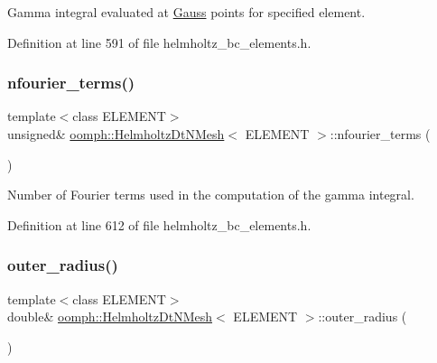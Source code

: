 Gamma integral evaluated at \hyperlink{classoomph_1_1Gauss}{Gauss} points for specified element. 



Definition at line 591 of file helmholtz\+\_\+bc\+\_\+elements.\+h.

\mbox{\label{classoomph_1_1HelmholtzDtNMesh_a7d71342179243a29a3b145a975e3d41e}} 
\subsubsection{\texorpdfstring{nfourier\+\_\+terms()}{nfourier\_terms()}}
{\footnotesize\ttfamily template$<$class E\+L\+E\+M\+E\+NT$>$ \\
unsigned\& \hyperlink{classoomph_1_1HelmholtzDtNMesh}{oomph\+::\+Helmholtz\+Dt\+N\+Mesh}$<$ E\+L\+E\+M\+E\+NT $>$\+::nfourier\+\_\+terms (\begin{DoxyParamCaption}{ }\end{DoxyParamCaption})\hspace{0.3cm}{\ttfamily [inline]}}



Number of Fourier terms used in the computation of the gamma integral. 



Definition at line 612 of file helmholtz\+\_\+bc\+\_\+elements.\+h.

\mbox{\label{classoomph_1_1HelmholtzDtNMesh_af7dc865c8a17b22ac3fbe2fe8573b80d}} 
\subsubsection{\texorpdfstring{outer\+\_\+radius()}{outer\_radius()}}
{\footnotesize\ttfamily template$<$class E\+L\+E\+M\+E\+NT$>$ \\
double\& \hyperlink{classoomph_1_1HelmholtzDtNMesh}{oomph\+::\+Helmholtz\+Dt\+N\+Mesh}$<$ E\+L\+E\+M\+E\+NT $>$\+::outer\+\_\+radius (\begin{DoxyParamCaption}{ }\end{DoxyParamCaption})\hspace{0.3cm}{\ttfamily [inline]}}




